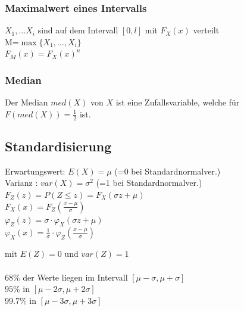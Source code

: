     \begin{multicols}{2}    
      \subsubsection{Maximalwert eines Intervalls}
        $X_1,\ldots X_i$ sind auf dem Intervall $[0,l]$ mit $F_X(x)$ verteilt\\
        M=$\max \{ X_1,\ldots,X_i\} $ \\
        $F_M(x)=F_X(x)^n$ \\
    \columnbreak
      \subsubsection{Median }
        Der Median $med(X)$ von $X$ ist eine Zufallsvariable, welche für
        $F(med(X)) = \frac{1}{2}$ ist.
      
    \end{multicols}

  \subsection{Standardisierung }
    \begin{multicols}{2}
      Erwartungswert: $E(X)=\mu$ \hspace{4mm}(=0 bei Standardnormalver.)\\ 
      Varianz \hspace{11.5mm}: $var(X)=\sigma^2$ (=1 bei Standardnormalver.)\\

      $F_Z(z) = P(Z \leq z) = F_X(\sigma z + \mu)$ \\
      $F_X(x) = F_Z(\frac{x-\mu}{\sigma})$\\
      $\varphi_Z(z) = \sigma \cdot \varphi_X(\sigma z + \mu)$\\
      $\varphi_X(x) = \frac{1}{\sigma} \cdot \varphi_Z(\frac{x - \mu}{\sigma})$ \\
      
    \columnbreak
    
       \hspace{5mm} mit $E(Z) = 0$ und $var(Z) = 1$\\ \\
      
      $68\% $ der Werte liegen im Intervall $[ \mu - \sigma, \mu + \sigma]$ \\ 
      $95\% $ in $[ \mu - 2\sigma, \mu + 2\sigma]$ \\
      $99.7\% $ in $[ \mu - 3\sigma, \mu + 3\sigma]$ \\
    
    \end{multicols}

